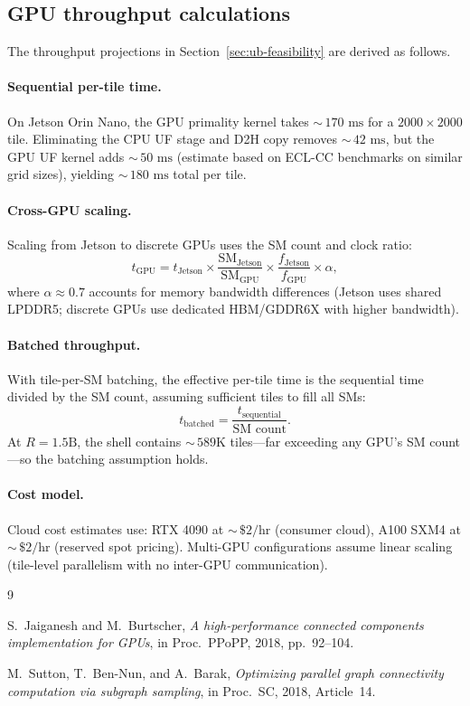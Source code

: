 \documentclass[11pt,a4paper]{article}
\theoremstyle{definition}
\theoremstyle{plain}
\theoremstyle{remark}
\begin{document}
\subsection{GPU throughput calculations}\label{app:gpu-throughput}

The throughput projections in Section~\ref{sec:ub-feasibility} are derived as follows.

\paragraph{Sequential per-tile time.}
On Jetson Orin Nano, the GPU primality kernel takes ${\sim}\,170\text{ ms}$ for a $2000 \times 2000$ tile.  Eliminating the CPU UF stage and D2H copy removes ${\sim}\,42\text{ ms}$, but the GPU UF kernel adds ${\sim}\,50\text{ ms}$ (estimate based on ECL-CC benchmarks on similar grid sizes), yielding ${\sim}\,180\text{ ms}$ total per tile.

\paragraph{Cross-GPU scaling.}
Scaling from Jetson to discrete GPUs uses the SM count and clock ratio:
\[
  t_{\text{GPU}} = t_{\text{Jetson}} \times \frac{\text{SM}_{\text{Jetson}}}{\text{SM}_{\text{GPU}}} \times \frac{f_{\text{Jetson}}}{f_{\text{GPU}}} \times \alpha,
\]
where $\alpha \approx 0.7$ accounts for memory bandwidth differences (Jetson uses shared LPDDR5; discrete GPUs use dedicated HBM/GDDR6X with higher bandwidth).

\paragraph{Batched throughput.}
With tile-per-SM batching, the effective per-tile time is the sequential time divided by the SM count, assuming sufficient tiles to fill all SMs:
\[
  t_{\text{batched}} = \frac{t_{\text{sequential}}}{\text{SM count}}.
\]
At $R = 1.5\text{B}$, the shell contains ${\sim}\,589\text{K}$ tiles---far exceeding any GPU's SM count---so the batching assumption holds.

\paragraph{Cost model.}
Cloud cost estimates use: RTX 4090 at ${\sim}\,\$2/\text{hr}$ (consumer cloud), A100 SXM4 at ${\sim}\,\$2/\text{hr}$ (reserved spot pricing).  Multi-GPU configurations assume linear scaling (tile-level parallelism with no inter-GPU communication).

\begin{thebibliography}{9}

S.~Jaiganesh and M.~Burtscher,
\emph{A high-performance connected components implementation for GPUs},
in Proc.\ PPoPP, 2018, pp.~92--104.

M.~Sutton, T.~Ben-Nun, and A.~Barak,
\emph{Optimizing parallel graph connectivity computation via subgraph sampling},
in Proc.\ SC, 2018, Article~14.

\end{thebibliography}
\end{document}
